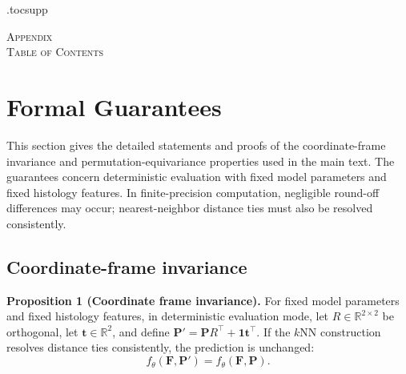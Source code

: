 \documentclass[11pt]{article}
\begin{document}
\clearpage
\appendix
\etocdepthtag.toc{supp}
\clearpage
\begin{center}
{\LARGE\scshape Appendix}\\[1.2em]
{\large\scshape Table of Contents}
\end{center}
\vspace{0.8em}
\etocsettocstyle{}{}
\begingroup
\hypersetup{linkcolor=black}
\tableofcontents
\endgroup
\clearpage
\let\appendixsection\section
\renewcommand{\section}{\clearpage\appendixsection}

\section{Formal Guarantees}
\label{app:formal_guarantees}

This section gives the detailed statements and proofs of the coordinate-frame invariance and
permutation-equivariance properties used in the main text. The guarantees concern deterministic
evaluation with fixed model parameters and fixed histology features. In finite-precision computation,
negligible round-off differences may occur; nearest-neighbor distance ties must also be resolved
consistently.

\subsection{Coordinate-frame invariance}

\textbf{Proposition 1 (Coordinate frame invariance).}
For fixed model parameters and fixed histology features, in deterministic evaluation mode, let
$R\in\mathbb{R}^{2\times2}$ be orthogonal, let $\mathbf{t}\in\mathbb{R}^{2}$, and define
$\mathbf{P}'=\mathbf{P}R^\top+\mathbf{1}\mathbf{t}^\top$. If the $k$NN construction resolves distance
ties consistently, the prediction is unchanged:
\begin{equation}
f_\theta(\mathbf{F},\mathbf{P}')=f_\theta(\mathbf{F},\mathbf{P}).
\end{equation}
\end{document}
